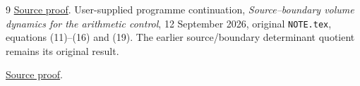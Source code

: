 \documentclass[11pt]{article}
\begin{document}
\begin{thebibliography}{9}
\href{https://github.com/KokunoYumeto/zeta-function-research-reader/blob/5992ad50c0f2a06921f1fcaded7b4e38097c0739/workbenches/splitzero-tandem/continuations/20260920-original-kernel-mixed-determinants/MIXED_CONFLUENT_PROOF.tex\#L1}{Source proof}.
 User-supplied programme continuation,
\emph{Source--boundary volume dynamics for the arithmetic control},
12 September 2026, original \texttt{NOTE.tex}, equations (11)--(16)
and (19). The earlier source/boundary determinant quotient remains
its original result.

\href{https://github.com/KokunoYumeto/zeta-function-research-reader/blob/5992ad50c0f2a06921f1fcaded7b4e38097c0739/workbenches/splitzero-tandem/continuations/20260920-original-kernel-mixed-determinants/providers/TODA_VOLUME_CONTROL.tex\#L1}{Source proof}.
\end{thebibliography}
\end{document}
